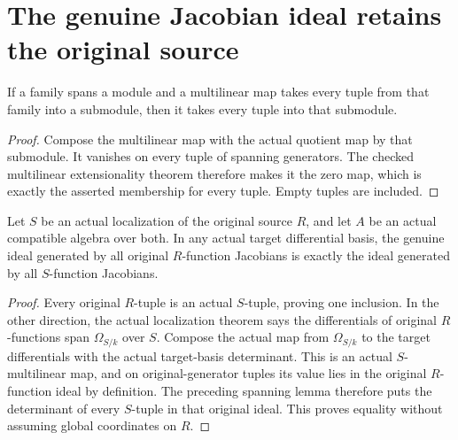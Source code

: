 \section{The genuine Jacobian ideal retains the original source}

\begin{lemma}\label{lem:sc0-multilinear-submodule-from-generators}
\leanok
If a family spans a module and a multilinear map takes every tuple from that
family into a submodule, then it takes every tuple into that submodule.
\end{lemma}
\begin{proof}
Compose the multilinear map with the actual quotient map by that submodule.
It vanishes on every tuple of spanning generators. The checked multilinear
extensionality theorem therefore makes it the zero map, which is exactly the
asserted membership for every tuple. Empty tuples are included.
\end{proof}

\begin{lemma}\label{lem:sc0-jacobian-source-localization}
\leanok
{}
Let $S$ be an actual localization of the original source $R$, and let $A$ be
an actual compatible algebra over both. In any actual target differential
basis, the genuine ideal generated by all original $R$-function Jacobians is
exactly the ideal generated by all $S$-function Jacobians.
\end{lemma}
\begin{proof}
Every original $R$-tuple is an actual $S$-tuple, proving one inclusion. In the
other direction, the actual localization theorem says the differentials of
original $R$-functions span $\Omega_{S/k}$ over $S$. Compose the actual map
from $\Omega_{S/k}$ to the target differentials with the actual target-basis
determinant. This is an actual $S$-multilinear map, and on original-generator
tuples its value lies in the original $R$-function ideal by definition.
The preceding spanning lemma therefore puts the determinant of every
$S$-tuple in that original ideal. This proves equality without assuming
global coordinates on $R$.
\end{proof}
